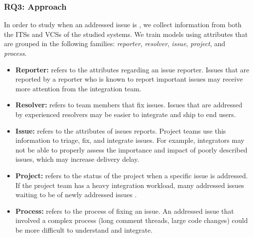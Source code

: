 \subsubsection*{RQ3: Approach} 

In order to study when an addressed issue is \DIFdelbegin {}\DIFdelend \DIFaddbegin {}\DIFaddend , we collect information from
both the ITSs and VCSs of the studied systems. We train models using attributes
that are grouped in the following families: \textit{reporter},
\textit{resolver}, \textit{issue}, \textit{project}, and \textit{process}.
\begin{itemize}
	\item \textbf{Reporter:} refers to the attributes regarding an issue reporter.
		Issues that are reported by a reporter who is known to report important
		issues may receive more attention from the integration team.\\

	\item \textbf{Resolver:} refers to team members that fix issues.
		Issues that are addressed by experienced resolvers may be easier
		to integrate and ship to end users.\\

	\item \textbf{Issue:} refers to the attributes of issues reports. Project teams use this
		information to triage, fix, and integrate issues. For
		example, integrators may not be able to properly assess the
		importance and impact of poorly described issues, which may
		increase delivery delay.\\

	\item \textbf{Project:} refers to the status of the project when a
		specific issue is addressed. If the project team has a heavy
		integration workload, \ie many addressed issues waiting to be
		\DIFdelbegin {}\DIFdelend \DIFaddbegin {}\DIFaddend of newly addressed issues \DIFdelbegin {}\DIFdelend \DIFaddbegin {}\DIFaddend .\\

	\item \textbf{Process:} refers to the process of fixing an issue. An
		addressed issue that involved a complex process (\eg long comment
		threads, large code changes) could be more difficult to
		understand and integrate.\\
\end{itemize}

